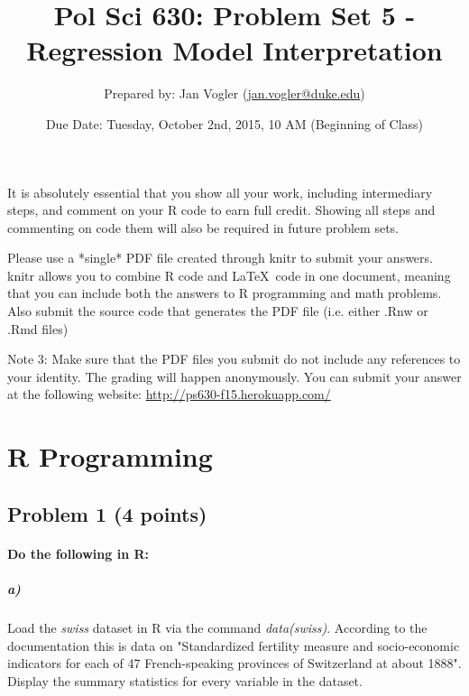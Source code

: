 \documentclass[12pt]{article}
\begin{document}
\title{Pol Sci 630: Problem Set 5 - Regression Model Interpretation}

\author{Prepared by: Jan Vogler (\href{mailto:jan.vogler@duke.edu}{jan.vogler@duke.edu})}

\date{Due Date: Tuesday, October 2nd, 2015, 10 AM (Beginning of Class)}
 
\maketitle 



It is absolutely essential that you show all your work, including intermediary steps, and comment on your R code to earn full credit. Showing all steps and commenting on code them will also be required in future problem sets.

Please use a *single* PDF file created through knitr to submit your answers. knitr allows you to combine R code and \LaTeX \ code in one document, meaning that you can include both the answers to R programming and math problems. Also submit the source code that generates the PDF file (i.e. either .Rnw or .Rmd files)

Note 3: Make sure that the PDF files you submit do not include any references to your identity. The grading will happen anonymously. You can submit your answer at the following website: \url{http://ps630-f15.herokuapp.com/}



\section*{R Programming}

\subsection*{Problem 1 (4 points)}

\paragraph{Do the following in R:}

\subparagraph{a)} Load the \textit{swiss} dataset in R via the command \textit{data(swiss)}. According to the documentation this is data on "Standardized fertility measure and socio-economic indicators for each of 47 French-speaking provinces of Switzerland at about 1888". Display the summary statistics for every variable in the dataset.
\end{document}
